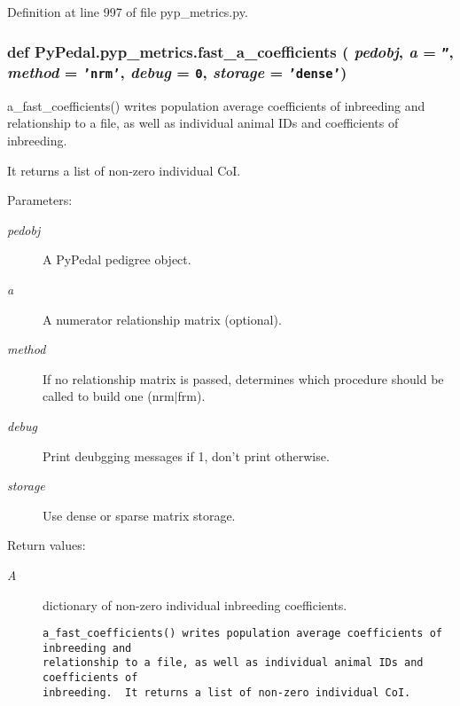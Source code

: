 Definition at line 997 of file pyp\_\-metrics.py.\hypertarget{namespacePyPedal_1_1pyp__metrics_b054b0e4d468ae4013645af61102f6f3}{
\subsubsection[fast\_\-a\_\-coefficients]{\setlength{\rightskip}{0pt plus 5cm}def Py\-Pedal.pyp\_\-metrics.fast\_\-a\_\-coefficients ( {\em pedobj},  {\em a} = {\tt ''},  {\em method} = {\tt 'nrm'},  {\em debug} = {\tt 0},  {\em storage} = {\tt 'dense'})}}
\label{namespacePyPedal_1_1pyp__metrics_b054b0e4d468ae4013645af61102f6f3}


a\_\-fast\_\-coefficients() writes population average coefficients of inbreeding and relationship to a file, as well as individual animal IDs and coefficients of inbreeding. 

It returns a list of non-zero individual Co\-I. \begin{Desc}
\item[Parameters:]
\begin{description}
\item[{\em pedobj}]A Py\-Pedal pedigree object. \item[{\em a}]A numerator relationship matrix (optional). \item[{\em method}]If no relationship matrix is passed, determines which procedure should be called to build one (nrm$|$frm). \item[{\em debug}]Print deubgging messages if 1, don't print otherwise. \item[{\em storage}]Use dense or sparse matrix storage. \end{description}
\end{Desc}
\begin{Desc}
\item[Return values:]
\begin{description}
\item[{\em A}]dictionary of non-zero individual inbreeding coefficients.

\footnotesize\begin{verbatim}a_fast_coefficients() writes population average coefficients of inbreeding and
relationship to a file, as well as individual animal IDs and coefficients of
inbreeding.  It returns a list of non-zero individual CoI.
\end{verbatim}
\normalsize
 \end{description}
\end{Desc}


